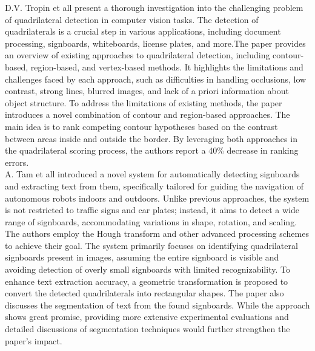 D.V. Tropin et all present  a thorough investigation into the challenging problem of quadrilateral detection in computer vision tasks. The detection of quadrilaterals is a crucial step in various applications, including document processing, signboards, whiteboards, license plates, and more.The paper provides an overview of existing approaches to quadrilateral detection, including contour-based, region-based, and vertex-based methods. It  highlights the limitations and challenges faced by each approach, such as difficulties in handling occlusions, low contrast, strong lines, blurred images, and lack of a priori 
information about object structure. To address the limitations of existing methods, the paper introduces a novel combination of contour and region-based approaches. The main idea is to rank competing contour hypotheses based on the contrast between areas inside and outside the border. By leveraging both approaches in the quadrilateral scoring process, the authors report a 40\% decrease in ranking errors\cite{tropin2021approach}.\\

A. Tam et all introduced a novel system for automatically detecting signboards and extracting text from them, specifically tailored for guiding the navigation of autonomous robots indoors and outdoors. Unlike previous approaches, the system is not restricted to traffic signs and car plates; instead, it aims to detect a wide range of signboards, accommodating variations in shape, rotation, and scaling. The authors employ the Hough transform and other advanced processing schemes to achieve their goal. The system primarily focuses on identifying quadrilateral signboards present in images, assuming the entire signboard is visible and avoiding detection of overly small signboards with limited recognizability. To enhance text extraction accuracy, a geometric transformation is proposed to convert the detected quadrilaterals into rectangular shapes. The paper also discusses the segmentation of text from the found signboards. While the approach shows great promise, providing more extensive experimental evaluations and detailed discussions of segmentation techniques would further strengthen the paper's impact\cite{tam2003quadrilateral}. \\

